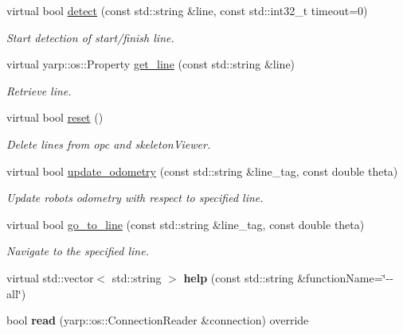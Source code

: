 \begin{DoxyCompactItemize}
\item 
virtual bool \mbox{\hyperlink{classlineDetector__IDL_a393124f2e4ea02a0ef2d4ba4df5d73c0}{detect}} (const std\+::string \&line, const std\+::int32\+\_\+t timeout=0)
\begin{DoxyCompactList}\small\item\em Start detection of start/finish line. \end{DoxyCompactList}\item 
virtual yarp\+::os\+::\+Property \mbox{\hyperlink{classlineDetector__IDL_ae617a7505a800d086c201e047f32918b}{get\+\_\+line}} (const std\+::string \&line)
\begin{DoxyCompactList}\small\item\em Retrieve line. \end{DoxyCompactList}\item 
virtual bool \mbox{\hyperlink{classlineDetector__IDL_a665153eb57fa761fe6dd9ae741169f7b}{reset}} ()
\begin{DoxyCompactList}\small\item\em Delete lines from opc and skeleton\+Viewer. \end{DoxyCompactList}\item 
virtual bool \mbox{\hyperlink{classlineDetector__IDL_ad4a235bdfaed101e3dd2435902347df3}{update\+\_\+odometry}} (const std\+::string \&line\+\_\+tag, const double theta)
\begin{DoxyCompactList}\small\item\em Update robot\textquotesingle{}s odometry with respect to specified line. \end{DoxyCompactList}\item 
virtual bool \mbox{\hyperlink{classlineDetector__IDL_af8af05e2ad1ad143c42d5229242bc7f3}{go\+\_\+to\+\_\+line}} (const std\+::string \&line\+\_\+tag, const double theta)
\begin{DoxyCompactList}\small\item\em Navigate to the specified line. \end{DoxyCompactList}\item 
\mbox{\label{classlineDetector__IDL_ac0e08d7eaab969b6d38519abd4118923}} 
virtual std\+::vector$<$ std\+::string $>$ {\bfseries help} (const std\+::string \&function\+Name=\char`\"{}-\/-\/all\char`\"{})
\item 
\mbox{\label{classlineDetector__IDL_a0ae07f2cb8270fc30b5358f4ba1e9796}} 
bool {\bfseries read} (yarp\+::os\+::\+Connection\+Reader \&connection) override
\end{DoxyCompactItemize}


